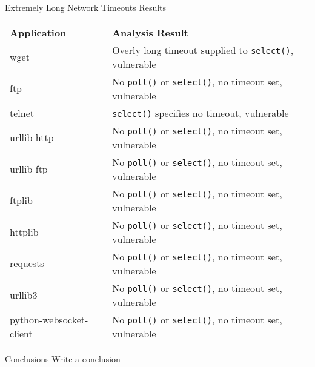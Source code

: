 \documentclass[pdf]{beamer}
\begin{document}
\begin{frame}{Extremely Long Network Timeouts Results}
  \tiny{}
  \begin{tabular}{l | l}
    {\bf Application}              & {\bf Analysis Result}\\
    wget                     & Overly long timeout supplied to {\tt select()}, vulnerable\\
    ftp                      & No {\tt poll()} or {\tt select()}, no timeout set, vulnerable\\
    telnet                   & {\tt select()} specifies no timeout, vulnerable\\
    urllib http              & No {\tt poll()} or {\tt select()}, no timeout set, vulnerable\\
    urllib ftp               & No {\tt poll()} or {\tt select()}, no timeout set, vulnerable\\
    ftplib                   & No {\tt poll()} or {\tt select()}, no timeout set, vulnerable\\
    httplib                  & No {\tt poll()} or {\tt select()}, no timeout set, vulnerable\\
    requests                 & No {\tt poll()} or {\tt select()}, no timeout set, vulnerable\\
    urllib3                  & No {\tt poll()} or {\tt select()}, no timeout set, vulnerable\\
    python-websocket-client  & No {\tt poll()} or {\tt select()}, no timeout set, vulnerable\\
  \end{tabular}
\end{frame}


\begin{frame}{Conclusions}
Write a conclusion
\end{frame}
     
\end{document}
